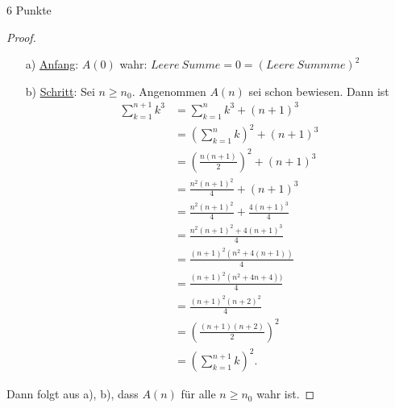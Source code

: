 \documentclass{problemset}
\begin{document}
\begin{problem}[Summenformeln]{6 Punkte}
\begin{proof}
\begin{enumerate}
        \item[a)] \underline{Anfang}: $A(0)$ wahr: $Leere\ Summe = 0 = (Leere\
              Summme)^2$
        \item[b)] \underline{Schritt}: Sei $n \ge n_0$. Angenommen $A(n)$ sei
              schon bewiesen. Dann ist \begin{align}
                  \sum_{k = 1}^{n + 1} k^3 & = \sum_{k = 1}^{n}k^3 + (n + 1)^3                                           \\
                                           & = \left(\sum_{k = 1}^{n}k\right)^2 + (n + 1)^3 \tag{Gausische summenformel} \\
                                           & = \left(\frac{n(n+1)}{2}\right)^2 + (n + 1)^3                               \\
                                           & = \frac{n^2(n+1)^2}{4} + (n + 1)^3                                          \\
                                           & = \frac{n^2(n+1)^2}{4} + \frac{4(n + 1)^3}{4}                               \\
                                           & = \frac{n^2(n+1)^2 + 4(n + 1)^3}{4}                                         \\
                                           & = \frac{(n+1)^2(n^2 + 4(n + 1))}{4}                                         \\
                                           & = \frac{(n+1)^2(n^2 + 4n + 4))}{4}                                          \\
                                           & = \frac{(n+1)^2(n +2)^2}{4}                                                 \\
                                           & = \left(\frac{(n+1)(n +2)}{2}\right)^2                                      \\
                                           & = \left(\sum_{k=1}^{n+1}k\right)^2.
              \end{align}
    \end{enumerate}
    Dann folgt aus a), b), dass $A(n)$ für alle $n \ge n_0$ wahr ist.
\end{proof}


\end{problem}
\end{document}
